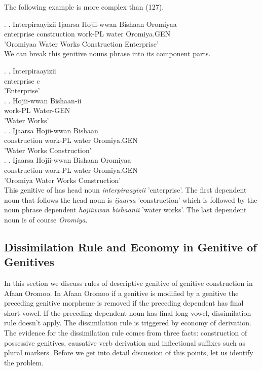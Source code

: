 \documentclass[11pt,a4paper]{article}
\begin{document}
	The following example is more complex than (127).
	
	 \ex.
	 \ag.
	 Interpiraayizii Ijaarsa Hojii-wwan Bishaan Oromiyaa\\
	 enterprise construction work-PL water Oromiya.GEN\\
	 'Oromiyaa Water Works Construction Enterprise'\\
	
	
	We can break this genitive nouns phrase into its component parts.
	
	\ex.
	\ag.
	Interpiraayizii\\
	enterprise c\\
	'Enterprise'\\
	
	\ex.
	\ag.
	Hojii-wwan Bishaan-ii\\
	work-PL Water-GEN\\
	'Water Works'\\
	
	\ex.
	\ag.
	Ijaarsa Hojii-wwan Bishaan\\
	construction work-PL water Oromiya.GEN\\
	'Water Works Construction'\\
	
	\ex.
	\ag.
	Ijaarsa Hojii-wwan Bishaan Oromiyaa\\
	construction work-PL water Oromiya.GEN\\
	'Oromiya Water Works Construction'\\

	This genitive of has head noun \emph{interpiraayizii} 'enterprise'. The first dependent noun that follows the head noun is \emph{ijaarsa} 'construction' which is followed by the noun phrase dependent \emph{hojiiwwan bishaanii} 'water works'. The last dependent noun is of course \emph{Oromiya}. 
	
	\subsection{Dissimilation Rule and Economy in Genitive of Genitives}
	
	In this section we discuss rules of descriptive genitive of genitive construction in Afaan Oromoo. In Afaan Oromoo if a genitive is modified by a genitive the preceding genitive morpheme is removed if the preceding dependent has final short vowel. If the preceding dependent noun has final long vowel, dissimilation rule doesn't apply. The dissimilation rule is triggered by economy of derivation. The evidence for the dissimilation rule comes from three facts: construction of possessive genitives, causative verb derivation and inflectional suffixes such as plural markers. Before we get into detail discussion of this points, let us identify the problem. 
	
\end{document}
